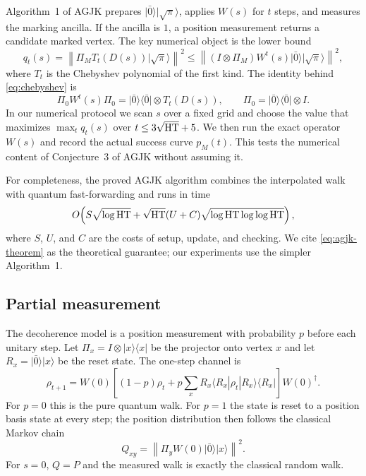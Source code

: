 Algorithm~1 of AGJK prepares $\lvert\bar0\rangle\lvert\sqrt{\pi}\rangle$,
applies $W(s)$ for $t$ steps, and measures the marking ancilla. If the ancilla
is $1$, a position measurement returns a candidate marked vertex. The key
numerical object is the lower bound
\begin{equation}
  q_t(s)=\left\lVert\Pi_M T_t(D(s))\lvert\sqrt{\pi}\rangle\right\rVert^2
  \le
  \left\lVert(I\otimes\Pi_M)W^t(s)\lvert\bar0\rangle\lvert\sqrt{\pi}\rangle
  \right\rVert^2,
  \label{eq:chebyshev}
\end{equation}
where $T_t$ is the Chebyshev polynomial of the first kind. The identity behind
\eqref{eq:chebyshev} is
\begin{equation}
  \Pi_0W^t(s)\Pi_0
  =\lvert\bar0\rangle\langle\bar0\rvert\otimes T_t(D(s)),
  \qquad
  \Pi_0=\lvert\bar0\rangle\langle\bar0\rvert\otimes I.
\end{equation}
In our numerical protocol we scan $s$ over a fixed grid and choose the value
that maximizes $\max_t q_t(s)$ over $t\le3\sqrt{\mathrm{HT}}+5$. We then run the exact
operator $W(s)$ and record the actual success curve $p_M(t)$. This tests the
numerical content of Conjecture~3 of AGJK without assuming it.

For completeness, the proved AGJK algorithm combines the interpolated walk with
quantum fast-forwarding and runs in time
\begin{equation}
  O\!\left(S\sqrt{\log\mathrm{HT}}
  +\sqrt{\mathrm{HT}}(U+C)\sqrt{\log\mathrm{HT}\log\log\mathrm{HT}}\right),
  \label{eq:agjk-theorem}
\end{equation}
where $S$, $U$, and $C$ are the costs of setup, update, and checking. We cite
\eqref{eq:agjk-theorem} as the theoretical guarantee; our experiments use the
simpler Algorithm~1.

\subsection{Partial measurement}
\label{sec:theory-measurement}

The decoherence model is a position measurement with probability $p$ before
each unitary step. Let
$\Pi_x=I\otimes\lvert x\rangle\langle x\rvert$ be the projector onto vertex
$x$ and let $R_x=\lvert\bar0\rangle\lvert x\rangle$ be the reset state. The
one-step channel is
\begin{equation}
  \rho_{t+1}
  =W(0)\left[(1-p)\rho_t+p\sum_xR_x\langle R_x|\rho_t|R_x\rangle\langle R_x|\right]W(0)^\dagger .
  \label{eq:measurement-channel}
\end{equation}
For $p=0$ this is the pure quantum walk. For $p=1$ the state is reset to a
position basis state at every step; the position distribution then follows the
classical Markov chain
\begin{equation}
  Q_{xy}=\left\lVert\Pi_yW(0)\lvert\bar0\rangle\lvert x\rangle\right\rVert^2.
\end{equation}
For $s=0$, $Q=P$ and the measured walk is exactly the classical random walk.

